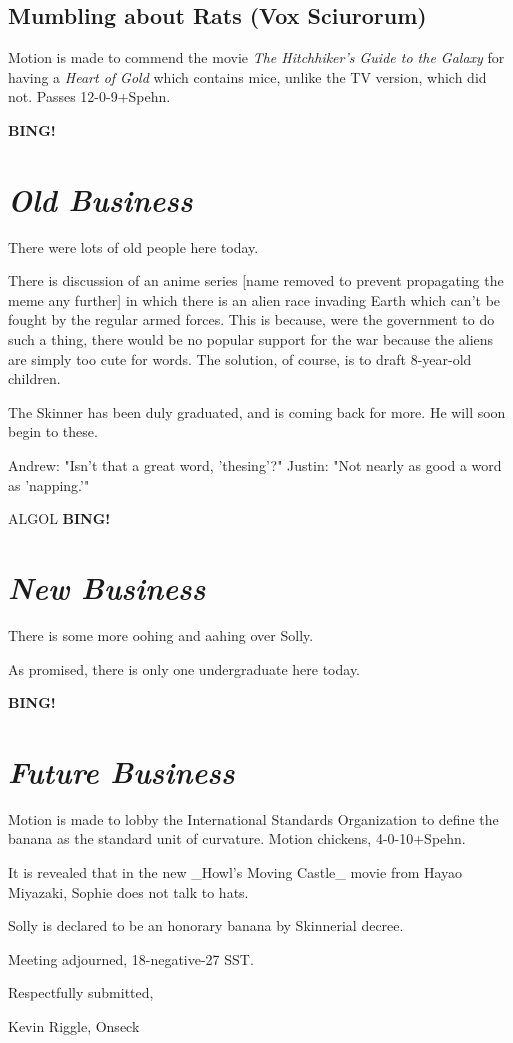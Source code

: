 \documentclass[10pt]{article}
\newcommand{\bing}{{\bf BING!} }
\newcommand{\goto}[1]{\bing \vskip 12pt \section*{{\em{#1}}}}
\begin{document}
\subsection*{Mumbling about Rats (Vox Sciurorum)}
Motion is made to commend the movie {\em The Hitchhiker's Guide to the Galaxy}
for having a {\em Heart of Gold} which contains mice, unlike the TV version,
which did not.  Passes 12-0-9+Spehn.

\goto{Old Business}

There were lots of old people here today.

There is discussion of an anime series [name removed to prevent propagating
the meme any further] in which there is an alien race invading Earth which
can't be fought by the regular armed forces.  This is because, were the 
government to do such a thing, there would be no popular support for the war 
because the aliens are simply too cute for words.  The solution, of course,
is to draft 8-year-old children.

The Skinner has been duly graduated, and is coming back for more.  He will
soon begin to these.  

Andrew: "Isn't that a great word, 'thesing'?"  
Justin: "Not nearly as good a word as 'napping.'"

ALGOL
\goto{New Business}

There is some more oohing and aahing over Solly.

As promised, there is only one undergraduate here today.

\goto{Future Business}


Motion is made to lobby the International Standards Organization to define
the banana as the standard unit of curvature.
Motion chickens, 4-0-10+Spehn.

It is revealed that in the new _Howl's Moving Castle_ movie from Hayao
Miyazaki, Sophie does not talk to hats.

Solly is declared to be an honorary banana by Skinnerial decree.

\vspace{12pt}

\noindent
Meeting adjourned, 18-negative-27 SST.

\vspace{18pt}

\centerline{Respectfully submitted,}
\centerline{Kevin Riggle, Onseck}
\end{document}
